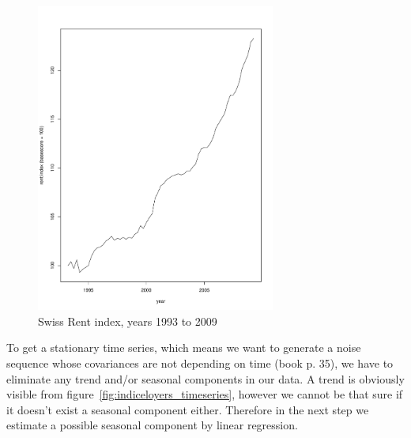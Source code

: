 \documentclass[11pt,a4paper]{article}
\begin{document}
\begin{figure}
\centering
\includegraphics[angle=0,
width=0.7\textwidth]{indiceloyers_train}
\caption{Swiss Rent index, years 1993 to 2009\label{fig:indiceloyers_train}}
\end{figure}

To get a stationary time series, which means we want to generate a noise sequence whose covariances are not depending on time (book p. 35), we have to eliminate any trend and/or seasonal components in our data. A trend is obviously visible from figure~\ref{fig:indiceloyers_timeseries}, however we cannot be that sure if it doesn't exist a seasonal component either. Therefore in the next step we estimate a possible seasonal component by linear regression. 
\end{document}
